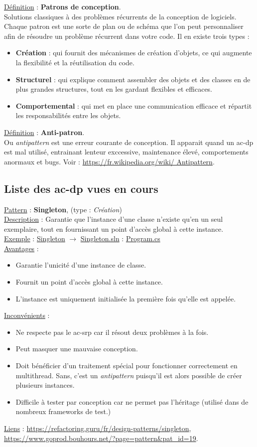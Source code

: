 \documentclass[a4paper,12pt,twoside]{article}
\newcommand{\exemplepath}{../Exercices}
\newcommand{\urlcolor}{magenta}  %
\newcommand{\foldercolor}{orange} %
\newcommand{\cscolor}{green!60!black} %
\newcommand{\slncolor}{violet} %
\newcommand{\defi}[2]{\noindent\underline{Définition} : \textbf{#1}.\\ \indent #2}
\newcommand{\csref}[2]{\hypersetup{urlcolor=\cscolor}\href{file:\exemplepath /#1.cs}{#2.cs}\hypersetup{urlcolor=\urlcolor}}
\newcommand{\slnref}[2]{\hypersetup{urlcolor=\slncolor}\href{file:\exemplepath /#1.sln}{#2.sln}\hypersetup{urlcolor=\urlcolor}}
\newcommand{\folderref}[2]{\hypersetup{urlcolor=\foldercolor}\href{file:\exemplepath /#1/.}{#2}\hypersetup{urlcolor=\urlcolor}}
\newcommand{\dpat}[7]{
\noindent \underline{Pattern} : \textbf{#1}, \indent (type : \textit{#2}) \\
\underline{Description} : \indent #3 \\
\underline{Exemple} : \indent #4 \\
\noindent \underline{Avantages} : 
\begin{itemize}
 #5
\end{itemize}
\noindent \underline{Inconvénients} : 
\begin{itemize}
 #6 
\end{itemize}
\underline{Liens} : #7 
}
\begin{document}
\defi{Patrons de conception}{Solutions classiques à des problèmes récurrents de la conception de logiciels. Chaque patron est une sorte de plan ou de schéma que l'on peut personnaliser afin de résoudre un problème récurrent dans votre code. Il en existe trois types :
\begin{itemize}
 \item \textbf{Création} : qui fournit des mécanismes de création d'objets, ce qui augmente la flexibilité et la réutilisation du code.
 \item \textbf{Structurel} : qui explique comment assembler des objets et des classes en de plus grandes structures, tout en les gardant flexibles et efficaces.
 \item \textbf{Comportemental} : qui met en place une communication efficace et répartit les responsabilités entre les objets.\\
\end{itemize}
}

\defi{Anti-patron}{Ou \textit{antipattern} est une erreur courante de conception. Il apparait quand un \gls{ac-dp} est mal utilisé, entrainant lenteur exccessive, maintenance élevé, comportements anormaux et bugs. Voir : \url{https://fr.wikipedia.org/wiki/
Antipattern}.} 

\subsection{Liste des \gls{ac-dp} vues en cours}

\dpat{Singleton}
{Création}
{Garantie que l'instance d'une classe n'existe qu'en un seul exemplaire, tout en fournissant un point d'accès global à cette instance.}
{\folderref{Singleton}{Singleton} $\to$ \slnref{Singleton/Singleton}{Singleton} : \indent \csref{Singleton/Singleton/Program}{Program}}
{\item Garantie l'unicité d'une instance de classe. 
\item Fournit un point d'accès global à cette instance.
\item L'instance est uniquement initialisée la première fois qu'elle est appelée.}
{\item Ne respecte pas le \gls{ac-srp} car il résout deux problèmes à la fois.
\item Peut masquer une mauvaise conception.
\item Doit bénéficier d'un traitement spécial pour fonctionner correctement en multithread. Sans, c'est un \textit{antipattern} puisqu'il est alors possible de créer plusieurs instances.
\item Difficile à tester par conception car ne permet pas l'héritage (utilisé dans de nombreux frameworks de test.)}
{\url{https://refactoring.guru/fr/design-patterns/singleton}, \\ \url{https://www.goprod.bouhours.net/?page=pattern&pat_id=19}.} \\
\end{document}
